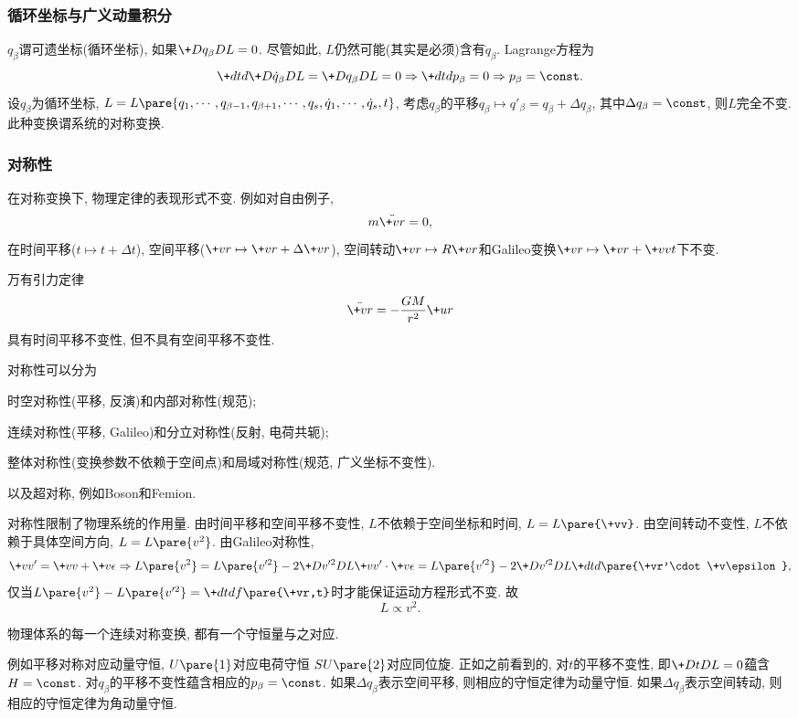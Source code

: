 \documentclass[../LectureNotes.tex]{subfiles}
\begin{document}
\subsubsection{循环坐标与广义动量积分} %
\label{ssub:循环坐标与广义动量积分}

$q_\beta$谓可遗坐标(循环坐标), 如果$\+D{q_\beta}DL = 0$. 尽管如此, $L$仍然可能(其实是必须)含有$\dot{q}_\beta$. Lagrange方程为
\[ \+dtd{} \+D{\dot{q}_\beta}DL = \+D{q_\beta}DL = 0\Rightarrow \+dtd{} p_\beta = 0 \Rightarrow p_\beta = \const. \]
设$q_\beta$为循环坐标, $L = L\pare{q_1,\cdots,q_{\beta-1},q_{\beta+1},\cdots,q_s,\dot{q}_1,\cdots,\dot{q}_s,t}$, 考虑$q_\beta$的平移$q_\beta \mapsto q'_\beta = q_\beta + \Delta q_\beta$, 其中$\Delta q_\beta = \const$, 则$L$完全不变. 此种变换谓系统的对称变换.


\subsubsection{对称性} %
\label{ssub:对称性}

在对称变换下, 物理定律的表现形式不变. 例如对自由例子,
\[ m\ddot{\+vr} = 0, \]
在时间平移($t\mapsto t+\Delta t$), 空间平移($\+vr \mapsto \+vr + \Delta \+vr$), 空间转动$\+vr \mapsto R\+vr$和Galileo变换$\+vr \mapsto \+vr + \+vv t$下不变.
\par
万有引力定律
\[ \ddot{\+vr} = -\frac{GM}{r^2}\+ur \]
具有时间平移不变性, 但不具有空间平移不变性.
\par
对称性可以分为
\begin{cenum}
    \item 时空对称性(平移, 反演)和内部对称性(规范);
    \item 连续对称性(平移, Galileo)和分立对称性(反射, 电荷共轭);
    \item 整体对称性(变换参数不依赖于空间点)和局域对称性(规范, 广义坐标不变性).
\end{cenum}
以及超对称, 例如Boson和Femion.
\par
对称性限制了物理系统的作用量. 由时间平移和空间平移不变性, $L$不依赖于空间坐标和时间, $L = L\pare{\+vv}$. 由空间转动不变性, $L$不依赖于具体空间方向, $L=L\pare{v^2}$. 由Galileo对称性,
\[ \+vv' = \+vv + \+v\epsilon \Rightarrow L\pare{v^2} = L\pare{v'^2} - 2\+D{v'^2}DL \+vv'\cdot\+v\epsilon = L\pare{v'^2} - 2\+D{v'^2}D{L}\+dtd{}\pare{\+vr'\cdot\+v\epsilon}, \]
仅当$L\pare{v^2} - L\pare{v'^2} = \displaystyle \+dtd{} f\pare{\+vr,t}$时才能保证运动方程形式不变. 故
\[ L\propto v^2. \]
\begin{theorem}[Noether定理]
    物理体系的每一个连续对称变换, 都有一个守恒量与之对应.
\end{theorem}
例如平移对称对应动量守恒, $U\pare{1}$对应电荷守恒 $SU\pare{2}$对应同位旋. 正如之前看到的, 对$t$的平移不变性, 即$\displaystyle \+DtDL = 0$蕴含$H = \const$. 对$q_\beta$的平移不变性蕴含相应的$p_\beta = \const$. 如果$\Delta q_\beta$表示空间平移, 则相应的守恒定律为动量守恒. 如果$\Delta q_\beta$表示空间转动, 则相应的守恒定律为角动量守恒.
\end{document}
